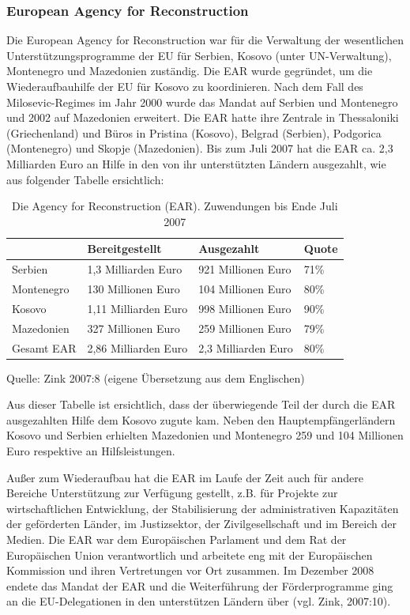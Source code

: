 \subsubsection{European Agency for Reconstruction}
Die European Agency for Reconstruction war für die Verwaltung der wesentlichen Unterstützungsprogramme der EU für Serbien, Kosovo (unter UN-Verwaltung), Montenegro und Mazedonien zuständig. Die EAR wurde gegründet, um die Wiederaufbauhilfe der EU für Kosovo zu koordinieren. Nach dem Fall des Milosevic-Regimes im Jahr 2000 wurde das Mandat auf Serbien und Montenegro und 2002 auf Mazedonien erweitert. Die EAR hatte ihre Zentrale in Thessaloniki (Griechenland) und Büros in Pristina (Kosovo), Belgrad (Serbien), Podgorica (Montenegro) und Skopje (Mazedonien). Bis zum Juli 2007 hat die EAR ca. 2,3 Milliarden Euro an Hilfe in den von ihr unterstützten Ländern ausgezahlt, wie aus folgender Tabelle ersichtlich:
\begin{table}[H]
\center
\caption{Die Agency for Reconstruction (EAR). Zuwendungen bis Ende Juli 2007}
\small{
\begin{tabular}{|L{20mm}|R{36mm}|R{36mm}|R{16mm}|}\hline
&
Bereitgestellt&
Ausgezahlt&
Quote\\\hline
Serbien&
1,3 Milliarden Euro&
921 Millionen Euro&
71\%\\\hline
Montenegro&
130 Millionen Euro&
104 Millionen Euro&
80\%\\\hline
Kosovo&
1,11 Milliarden Euro&
998 Millionen Euro&
90\%\\\hline
Mazedonien&
327 Millionen Euro&
259 Millionen Euro&
79\%\\\hline
Gesamt EAR&
2,86 Milliarden Euro&
2,3 Milliarden Euro&
80\%\\\hline
\end{tabular}
}
\end{table}
Quelle: Zink 2007:8 (eigene Übersetzung aus dem Englischen)

Aus dieser Tabelle ist ersichtlich, dass der überwiegende Teil der durch die EAR ausgezahlten Hilfe dem Kosovo zugute kam. Neben den Hauptempfängerländern Kosovo und Serbien erhielten Mazedonien und Montenegro 259 und 104 Millionen Euro respektive an Hilfsleistungen.\par
Außer zum Wiederaufbau hat die EAR im Laufe der Zeit auch für andere Bereiche Unterstützung zur Verfügung gestellt, z.B. für Projekte zur wirtschaftlichen Entwicklung, der Stabilisierung der administrativen Kapazitäten der geförderten Länder, im Justizsektor, der Zivilgesellschaft und im Bereich der Medien. Die EAR war dem Europäischen Parlament und dem Rat der Europäischen Union verantwortlich und arbeitete eng mit der Europäischen Kommission und ihren Vertretungen vor Ort zusammen. Im Dezember 2008 endete das Mandat der EAR und die Weiterführung der Förderprogramme ging an die EU-Delegationen in den unterstützen Ländern über (vgl. Zink, 2007:10).

